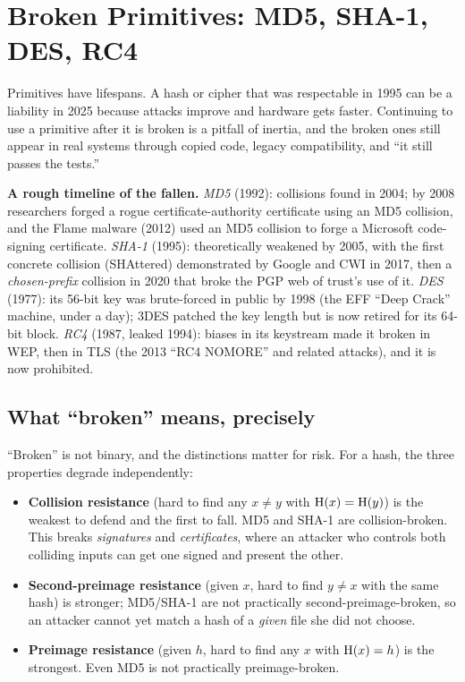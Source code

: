 \section{Broken Primitives: MD5, SHA-1, DES, RC4}
\label{ch38:broken-primitives}

Primitives have lifespans. A hash or cipher that was respectable in 1995 can be a liability in 2025 because attacks improve and hardware gets faster. Continuing to use a primitive after it is broken is a pitfall of inertia, and the broken ones still appear in real systems through copied code, legacy compatibility, and ``it still passes the tests.''

\begin{historybox}
\textbf{A rough timeline of the fallen.}
\emph{MD5} (1992): collisions found in 2004; by 2008 researchers forged a rogue certificate-authority certificate using an MD5 collision, and the Flame malware (2012) used an MD5 collision to forge a Microsoft code-signing certificate. \emph{SHA-1} (1995): theoretically weakened by 2005, with the first concrete collision (SHAttered) demonstrated by Google and CWI in 2017, then a \emph{chosen-prefix} collision in 2020 that broke the PGP web of trust's use of it. \emph{DES} (1977): its 56-bit key was brute-forced in public by 1998 (the EFF ``Deep Crack'' machine, under a day); 3DES patched the key length but is now retired for its 64-bit block. \emph{RC4} (1987, leaked 1994): biases in its keystream made it broken in WEP, then in TLS (the 2013 ``RC4 NOMORE'' and related attacks), and it is now prohibited.
\end{historybox}

\subsection{What ``broken'' means, precisely}
\label{ch38:broken-meaning}

``Broken'' is not binary, and the distinctions matter for risk. For a hash, the three properties degrade independently:

\begin{itemize}
\item \textbf{Collision resistance} (hard to find any $x \neq y$ with $\operatorname{H}(x)=\operatorname{H}(y)$) is the weakest to defend and the first to fall. MD5 and SHA-1 are collision-broken. This breaks \emph{signatures} and \emph{certificates}, where an attacker who controls both colliding inputs can get one signed and present the other.
\item \textbf{Second-preimage resistance} (given $x$, hard to find $y\neq x$ with the same hash) is stronger; MD5/SHA-1 are not practically second-preimage-broken, so an attacker cannot yet match a hash of a \emph{given} file she did not choose.
\item \textbf{Preimage resistance} (given $h$, hard to find any $x$ with $\operatorname{H}(x)=h$) is the strongest. Even MD5 is not practically preimage-broken.
\end{itemize}

